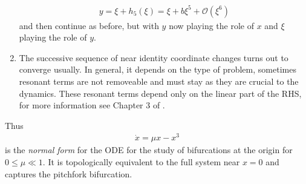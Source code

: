 \begin{ex}
\begin{enumerate}
	\begin{align}
		y = \xi + h_5(\xi) = \xi + b \xi^5 + \mathcal{O}(\xi^6)
	\end{align}
	and then continue as before, but with $y$ now playing the role of $x$ and $\xi$ playing the role of $y$.
\item The successive sequence of near identity coordinate changes turns out to converge usually. In general, it depends on the type of problem, sometimes resonant terms are not removeable and must stay as they are crucial to the dynamics. These resonant terms depend only on the linear part of the RHS, for more information see Chapter 3 of \cite{GuckenheimerHolmes}.
	\end{enumerate}
Thus 
\begin{align}
	\boxed{
\dot{x} = \mu x - x^3	
}
\end{align}
is the \emph{normal form} for the ODE for the study of bifurcations at the origin for $0 \leq \mu \ll 1$. It is topologically equivalent to the full system near $x=0$ and captures the pitchfork bifurcation.
\end{ex}

